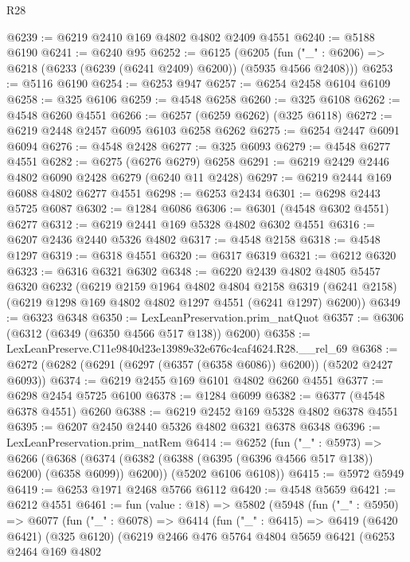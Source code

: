 \begin{lexlean}{R28}
\begin{coremodule}
@6239 := @6219 @2410 @169 @4802 @4802 @2409 @4551
@6240 := @5188 @6190
@6241 := @6240 @95
@6252 := @6125
    (@6205 (fun ("_" : @6206) => @6218 (@6233 (@6239 (@6241 @2409) @6200)) (@5935 @4566 @2408)))
@6253 := @5116 @6190
@6254 := @6253 @947
@6257 := @6254 @2458 @6104 @6109
@6258 := @325 @6106
@6259 := @4548 @6258
@6260 := @325 @6108
@6262 := @4548 @6260 @4551
@6266 := @6257 (@6259 @6262) (@325 @6118)
@6272 := @6219 @2448 @2457 @6095 @6103 @6258 @6262
@6275 := @6254 @2447 @6091 @6094
@6276 := @4548 @2428
@6277 := @325 @6093
@6279 := @4548 @6277 @4551
@6282 := @6275 (@6276 @6279) @6258
@6291 := @6219 @2429 @2446 @4802 @6090 @2428 @6279 (@6240 @11 @2428)
@6297 := @6219 @2444 @169 @6088 @4802 @6277 @4551
@6298 := @6253 @2434
@6301 := @6298 @2443 @5725 @6087
@6302 := @1284 @6086
@6306 := @6301 (@4548 @6302 @4551) @6277
@6312 := @6219 @2441 @169 @5328 @4802 @6302 @4551
@6316 := @6207 @2436 @2440 @5326 @4802
@6317 := @4548 @2158
@6318 := @4548 @1297
@6319 := @6318 @4551
@6320 := @6317 @6319
@6321 := @6212 @6320
@6323 := @6316 @6321 @6302
@6348 := @6220
    @2439
    @4802
    @4805
    @5457
    @6320
    @6232
    (@6219
      @2159
      @1964
      @4802
      @4804
      @2158
      @6319
      (@6241 @2158)
      (@6219 @1298 @169 @4802 @4802 @1297 @4551 (@6241 @1297) @6200))
@6349 := @6323 @6348
@6350 := LexLeanPreservation.prim_natQuot
@6357 := @6306 (@6312 (@6349 (@6350 @4566 @517 @138)) @6200)
@6358 := LexLeanPreserve.C11e9840d23e13989e32e676c4caf4624.R28.__rel_69
@6368 := @6272 (@6282 (@6291 (@6297 (@6357 (@6358 @6086)) @6200)) (@5202 @2427 @6093))
@6374 := @6219 @2455 @169 @6101 @4802 @6260 @4551
@6377 := @6298 @2454 @5725 @6100
@6378 := @1284 @6099
@6382 := @6377 (@4548 @6378 @4551) @6260
@6388 := @6219 @2452 @169 @5328 @4802 @6378 @4551
@6395 := @6207 @2450 @2440 @5326 @4802 @6321 @6378 @6348
@6396 := LexLeanPreservation.prim_natRem
@6414 := @6252
    (fun ("_" : @5973) =>
    @6266
      (@6368 (@6374 (@6382 (@6388 (@6395 (@6396 @4566 @517 @138)) @6200) (@6358 @6099)) @6200))
      (@5202 @6106 @6108))
@6415 := @5972 @5949
@6419 := @6253 @1971 @2468 @5766 @6112
@6420 := @4548 @5659
@6421 := @6212 @4551
@6461 := fun (value : @18) =>
  @5802
    (@5948
      (fun ("_" : @5950) =>
      @6077
        (fun ("_" : @6078) =>
        @6414
          (fun ("_" : @6415) =>
          @6419
            (@6420 @6421)
            (@325 @6120)
            (@6219
              @2466
              @476
              @5764
              @4804
              @5659
              @6421
              (@6253
                @2464
                @169
                @4802

\end{coremodule}
\end{lexlean}
